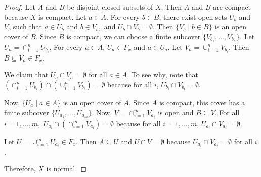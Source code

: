 \documentclass{amsart}
\begin{document}
\begin{proof}Let $A$ and $B$ be disjoint closed subsets of $X$.  Then $A$ and $B$ are compact because $X$ is compact.  Let $a \in A$.  For every $b \in B$, there exist open sets $U_b$ and $V_b$ such that $a \in U_b$ and $b \in V_b,$ and $U_b \cap V_b = \emptyset.$  Then $\{V_b \mid b \in B\}$ is an open cover of $B$.  Since $B$ is compact, we can choose a finite subcover $\{V_{b_1},\ldots,V_{b_n}\}.$  Let $U_a=\cap_{i=1}^n U_{b_i}$.  For every $a \in A$, $U_a \in F_x$ and $a \in U_a.$  Let $V_a=\cup_{i=1}^n V_{b_i}$.  Then $B \subseteq V_a  \in F_x$.  

We claim that $U_a \cap V_a = \emptyset$ for all $a \in A$.  To see why, note that $\left( \cap_{i=1}^n U_{b_i}\right) \cap \left( \cup_{i=1}^n V_{b_i} \right) = \emptyset$ because for all $i$, $U_{b_i} \cap V_{b_i}=\emptyset.$

Now, $\{U_a \mid a \in A\}$ is an open cover of $A$.  Since $A$ is compact, this cover has a finite subcover $\{U_{a_1},\ldots,U_{a_m}\}$.  Now, $V=\cap_{i=1}^{m}V_{a_i}$ is open and $B \subseteq V$. For all $i=1,\ldots,m,$ $U_{a_i}\cap \left( \cap_{i=1}^m V_{a_i} \right) = \emptyset$ because for all $i=1,\ldots,m$, $U_{a_i} \cap V_{a_i}=\emptyset$.   

Let $U=\cup_{i=1}^m U_{a_i} \in F_x$.  Then $A \subseteq U$ and $U \cap V = \emptyset$ because $U_{a_i} \cap V_{a_i}=\emptyset$ for all $i$.

Therefore, $X$ is normal.  
\end{proof}
\end{document}
